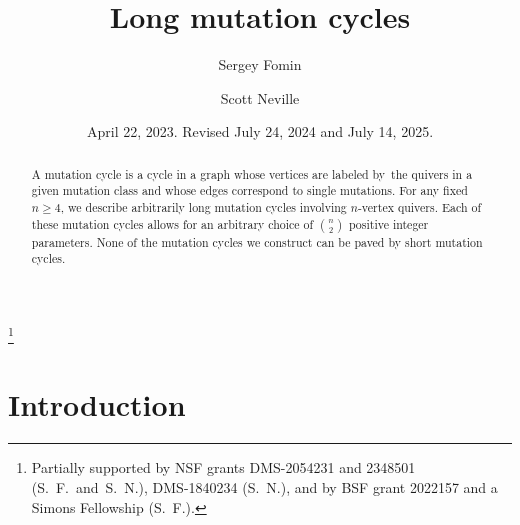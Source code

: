 \documentclass[11pt, letterpaper]{amsart}
\theoremstyle{definition}
\numberwithin{equation}{section}
\begin{document}
\title{Long mutation cycles}
\author{Sergey Fomin}
\address{Department of Mathematics, University of Michigan,
Ann Arbor, MI 48109, USA}

\author{Scott Neville}
\address{Department of Mathematics, University of Michigan, Ann Arbor, MI 48109, USA}


\newcommand{\h}{u} %
\newcommand{\oboxed}[1]{\ovalbox{$#1$}}
\cornersize*{12pt}
\setlength{\fboxsep}{2pt}

\date{April 22, 2023. Revised July 24, 2024 and July 14, 2025.}

\thanks{Partially supported by NSF grants DMS-2054231 and 2348501 (S.~F.\ and~S.~N.),
DMS-1840234 (S.~N.), 
and by BSF grant 2022157 and a Simons Fellowship (S.~F.).
}



\begin{abstract}
A mutation cycle is a cycle in a graph whose vertices are labeled by~the quivers
in a given mutation  class and whose edges correspond to single mutations. 
%
For any fixed $n\ge 4$, we describe arbitrarily long mutation cycles involving $n$-vertex quivers.
Each of these mutation cycles allows for an arbitrary choice of $\binom{n}{2}$ positive integer parameters. 
None of the mutation cycles we construct can be paved by short mutation cycles. 
\end{abstract}


\maketitle


\section{Introduction}
\end{document}
